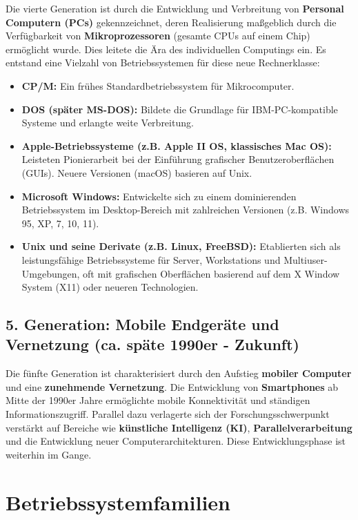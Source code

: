 Die vierte Generation ist durch die Entwicklung und Verbreitung von \textbf{Personal Computern (PCs)} gekennzeichnet, deren Realisierung maßgeblich durch die Verfügbarkeit von \textbf{Mikroprozessoren} (gesamte CPUs auf einem Chip) ermöglicht wurde. Dies leitete die Ära des individuellen Computings ein. Es entstand eine Vielzahl von Betriebssystemen für diese neue Rechnerklasse:

\begin{itemize}
    \item \textbf{CP/M:} Ein frühes Standardbetriebssystem für Mikrocomputer.
    \item \textbf{DOS (später MS-DOS):} Bildete die Grundlage für IBM-PC-kompatible Systeme und erlangte weite Verbreitung.
    \item \textbf{Apple-Betriebssysteme (z.B. Apple II OS, klassisches Mac OS):} Leisteten Pionierarbeit bei der Einführung grafischer Benutzeroberflächen (GUIs). Neuere Versionen (macOS) basieren auf Unix.
    \item \textbf{Microsoft Windows:} Entwickelte sich zu einem dominierenden Betriebssystem im Desktop-Bereich mit zahlreichen Versionen (z.B. Windows 95, XP, 7, 10, 11).
    \item \textbf{Unix und seine Derivate (z.B. Linux, FreeBSD):} Etablierten sich als leistungsfähige Betriebssysteme für Server, Workstations und Multiuser-Umgebungen, oft mit grafischen Oberflächen basierend auf dem X Window System (X11) oder neueren Technologien.
\end{itemize}

\subsection{5. Generation: Mobile Endgeräte und Vernetzung (ca. späte 1990er - Zukunft)}

Die fünfte Generation ist charakterisiert durch den Aufstieg \textbf{mobiler Computer} und eine \textbf{zunehmende Vernetzung}. Die Entwicklung von \textbf{Smartphones} ab Mitte der 1990er Jahre ermöglichte mobile Konnektivität und ständigen Informationszugriff. Parallel dazu verlagerte sich der Forschungsschwerpunkt verstärkt auf Bereiche wie \textbf{künstliche Intelligenz (KI)}, \textbf{Parallelverarbeitung} und die Entwicklung neuer Computerarchitekturen. Diese Entwicklungsphase ist weiterhin im Gange.

\section{Betriebssystemfamilien}

